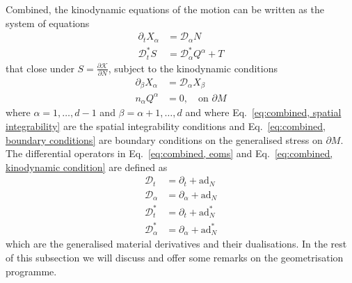 Combined, the kinodynamic equations of the motion can be written as the system of equations
\begin{subequations} \label{eq:combined, eoms}
\begin{align}
\partial_t X_\alpha & = \mathcal{D}_\alpha N \label{eq:combined, eoms kinematic} \\
\mathcal{D}^*_t S & = \mathcal{D}^*_\alpha Q^\alpha + T
\end{align}
\end{subequations}
that close under $S = \frac{\partial \mathcal{K}}{\partial N}$, subject to the kinodynamic conditions
\begin{subequations} \label{eq:combined, kinodynamic condition}
	\begin{align}
		\partial_\beta X_\alpha & = \mathcal{D}_\alpha X_\beta \label{eq:combined, spatial integrability} \\
		n_\alpha Q^\alpha & = 0, \quad \text{on } \partial M \label{eq:combined, boundary conditions} 
	\end{align}
\end{subequations}
where $\alpha = 1, \dots, d-1$ and $\beta = \alpha+1, \dots, d$ and where Eq.~\ref{eq:combined, spatial integrability} are the spatial integrability conditions and Eq.~\ref{eq:combined, boundary conditions} are boundary conditions on the generalised stress on $\partial M$. The differential operators in Eq.~\ref{eq:combined, eoms} and Eq.~\ref{eq:combined, kinodynamic condition} are defined as
\begin{subequations} \label{eq:combined, generalised material derivatives}
	\begin{align}
		\mathcal{D}_t & = \partial_t + \text{ad}_N \\
		\mathcal{D}_\alpha & = \partial_\alpha + \text{ad}_N \\
		\mathcal{D}^*_t & = \partial_t + \text{ad}^*_N \\
		\mathcal{D}^*_\alpha & = \partial_\alpha + \text{ad}^*_N
	\end{align}
\end{subequations}
which are the generalised material derivatives and their dualisations. In the rest of this subsection we will discuss and offer some remarks on the geometrisation programme.

